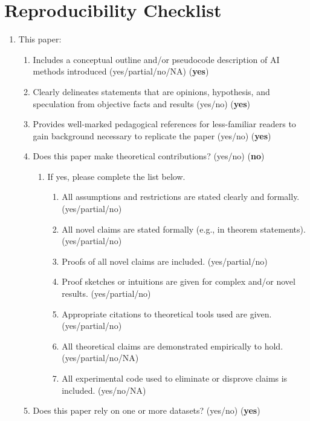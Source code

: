 \section*{Reproducibility Checklist}
\begin{enumerate}
    \item This paper:
    \begin{enumerate}
        \item Includes a conceptual outline and/or pseudocode description of AI methods introduced (yes/partial/no/NA)  (\textbf{yes})
        \item Clearly delineates statements that are opinions, hypothesis, and speculation from objective facts and results (yes/no)  (\textbf{yes})
        \item Provides well-marked pedagogical references for less-familiar readers to gain background necessary to replicate the paper (yes/no)  (\textbf{yes})
        \item Does this paper make theoretical contributions? (yes/no)  (\textbf{no})
        \begin{enumerate}
            \item If yes, please complete the list below.
            \begin{enumerate}
                \item All assumptions and restrictions are stated clearly and formally. (yes/partial/no)
                \item All novel claims are stated formally (e.g., in theorem statements). (yes/partial/no)
                \item Proofs of all novel claims are included. (yes/partial/no)
                \item Proof sketches or intuitions are given for complex and/or novel results. (yes/partial/no)
                \item Appropriate citations to theoretical tools used are given. (yes/partial/no)
                \item All theoretical claims are demonstrated empirically to hold. (yes/partial/no/NA)
                \item All experimental code used to eliminate or disprove claims is included. (yes/no/NA)
            \end{enumerate}
        \end{enumerate}
        \item Does this paper rely on one or more datasets? (yes/no) (\textbf{yes})
        \begin{enumerate}

\end{enumerate}
\end{enumerate}
\end{enumerate}
